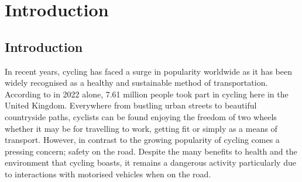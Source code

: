 \documentclass{l4proj}
\begin{document}
\tableofcontents

%
%
%
%
%
%
%

\chapter{Introduction}


\section{Introduction}
In recent years, cycling has faced a surge in popularity worldwide as it has been widely recognised as a healthy and sustainable method of transportation. According to \citep{statista} in 2022 alone, 7.61 million people took part in cycling here in the United Kingdom. Everywhere from bustling urban streets to beautiful countryside paths, cyclists can be found enjoying the freedom of two wheels whether it may be for travelling to work, getting fit or simply as a means of transport. However, in contrast to the growing popularity of cycling comes a pressing concern; safety on the road. Despite the many benefits to health and the environment that cycling boasts, it remains a dangerous activity particularly due to interactions with motorised vehicles when on the road.
\end{document}
